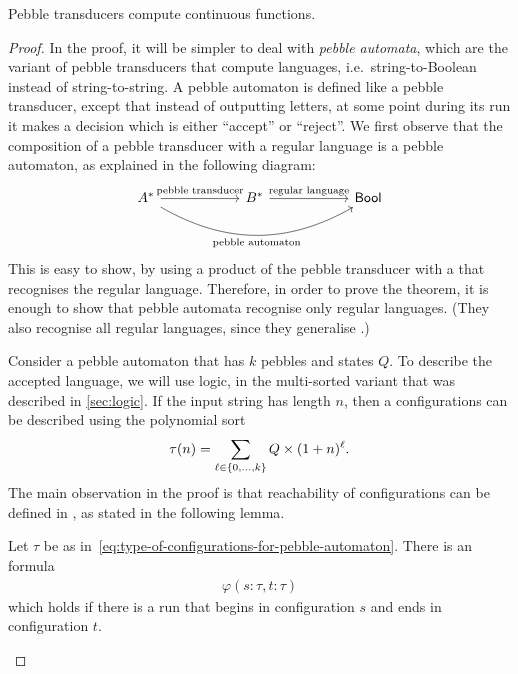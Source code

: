 \begin{theorem}
    \label{thm:pebble-are-continuous}
    Pebble transducers compute continuous functions.
\end{theorem}
\begin{proof}
    In the proof, it will be simpler to deal with \emph{pebble automata}, which are the variant of pebble transducers that compute languages, i.e.~string-to-Boolean instead of string-to-string. A pebble automaton is defined like a pebble transducer, except that instead of outputting letters, at some point during its run it makes a decision which is either ``accept'' or ``reject''.
    We first observe that the composition of  a pebble transducer with a regular language is a pebble automaton, as explained in the following diagram:
    \[
    \begin{tikzcd}[column sep=2cm]
    A^*
    \ar[r,"\text{pebble transducer}"]
    \ar[rr,bend right, "\text{pebble automaton}"']
    &
    B^*
    \ar[r,"\text{regular language}"]
    &
    \Bool
    \end{tikzcd}
    \]
    This is easy to show, by using a product of the pebble transducer with a \dfa that recognises the regular language. Therefore, in order to prove the theorem, it is enough to show that pebble automata recognise only regular languages. (They also recognise all regular languages, since they generalise \dfa.) 
 
    Consider a pebble automaton that has $k$ pebbles and states $Q$. To describe the accepted language, we will use \mso logic, in the multi-sorted variant that was described in \cref{sec:logic}. If the input string has length $n$, then a configurations can be described using the polynomial sort
    \begin{align}
        \label{eq:type-of-configurations-for-pebble-automaton}
    \tau(n) = \sum_{\ell \in \{0,\ldots,k\}} Q \times (1+n)^\ell.
    \end{align}
    The main observation in the proof is that reachability of configurations can be defined in \mso,  as stated in the following lemma.
    \begin{lemma}\label{lem:reachability-pebble-automaton}
        Let $\tau$ be as in~\eqref{eq:type-of-configurations-for-pebble-automaton}. There is an \mso formula 
    \begin{align*}
    \varphi(s: \tau, t : \tau)
    \end{align*}
    which holds if there is a run that begins in configuration $s$ and ends in configuration $t$.
    \end{lemma}
    


\end{proof}
